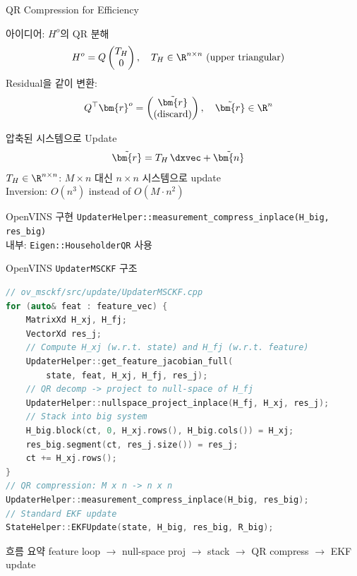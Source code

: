 \begin{frame}[shrink=10]{QR Compression for Efficiency}
  \begin{block}{아이디어: $H^o$의 QR 분해}
    \begin{align*}
      H^o &= Q \begin{pmatrix} T_H \\ 0 \end{pmatrix}, \quad
      T_H \in \R^{n\times n} \text{ (upper triangular)}
    \end{align*}
    Residual을 같이 변환:
    \begin{align*}
      Q^\top \bm{r}^o &= \begin{pmatrix} \tilde{\bm{r}} \\ \text{(discard)} \end{pmatrix},
      \quad \tilde{\bm{r}} \in \R^n
    \end{align*}
  \end{block}
  \begin{block}{압축된 시스템으로 Update}
    \begin{align*}
      \tilde{\bm{r}} &= T_H\,\dxvec + \tilde{\bm{n}}
    \end{align*}
    $T_H \in \R^{n\times n}$: $M\times n$ 대신 $n\times n$ 시스템으로 update\\
    Inversion: $O(n^3)$ instead of $O(M\cdot n^2)$
  \end{block}
  \begin{exampleblock}{OpenVINS 구현}
    \texttt{UpdaterHelper::measurement\_compress\_inplace(H\_big, res\_big)}\\
    내부: \texttt{Eigen::HouseholderQR} 사용
  \end{exampleblock}
\end{frame}

\begin{frame}[fragile]{OpenVINS \texttt{UpdaterMSCKF} 구조}
\begin{lstlisting}[language=C++]
// ov_msckf/src/update/UpdaterMSCKF.cpp
for (auto& feat : feature_vec) {
    MatrixXd H_xj, H_fj;
    VectorXd res_j;
    // Compute H_xj (w.r.t. state) and H_fj (w.r.t. feature)
    UpdaterHelper::get_feature_jacobian_full(
        state, feat, H_xj, H_fj, res_j);
    // QR decomp -> project to null-space of H_fj
    UpdaterHelper::nullspace_project_inplace(H_fj, H_xj, res_j);
    // Stack into big system
    H_big.block(ct, 0, H_xj.rows(), H_big.cols()) = H_xj;
    res_big.segment(ct, res_j.size()) = res_j;
    ct += H_xj.rows();
}
// QR compression: M x n -> n x n
UpdaterHelper::measurement_compress_inplace(H_big, res_big);
// Standard EKF update
StateHelper::EKFUpdate(state, H_big, res_big, R_big);
\end{lstlisting}
  \begin{exampleblock}{흐름 요약}
    feature loop $\to$ null-space proj $\to$ stack $\to$ QR compress $\to$ EKF update
  \end{exampleblock}
\end{frame}

